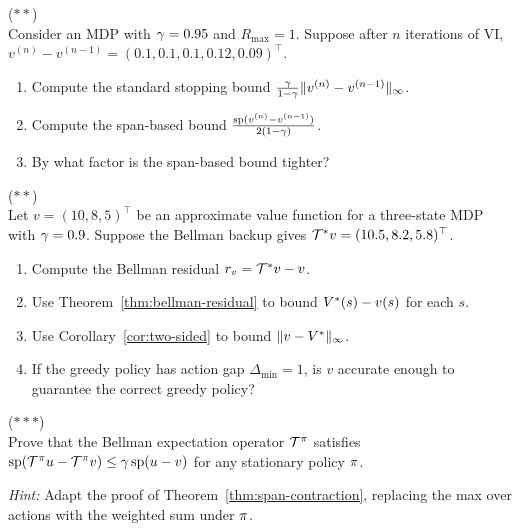 \documentclass[11pt,a4paper]{article}
\begin{document}
\begin{exercise}
\textnormal{(\(**\))} \\
Consider an MDP with $\gamma = 0.95$ and $R_{\max} = 1$. Suppose
after $n$ iterations of VI, $v^{(n)} - v^{(n-1)} = (0.1, 0.1, 0.1,
0.12, 0.09)^\top$.
\begin{enumerate}[label=(\alph*)]
    \item Compute the standard stopping bound
    $\frac{\gamma}{1-\gamma}\|v^{(n)} -
    v^{(n-1)}\|_\infty$.
    \item Compute the span-based bound
    $\frac{\mathrm{sp}(v^{(n)} - v^{(n-1)})}{2(1-\gamma)}$.
    \item By what factor is the span-based bound tighter?
\end{enumerate}
\end{exercise}

\begin{exercise} \textnormal{(\(**\))} \\
Let $v = (10, 8, 5)^\top$ be an approximate value function for a
three-state MDP with $\gamma = 0.9$. Suppose the Bellman backup
gives $\mathcal{T}^* v = (10.5, 8.2, 5.8)^\top$.
\begin{enumerate}[label=(\alph*)]
    \item Compute the Bellman residual $r_v = \mathcal{T}^* v - v$.
    \item Use Theorem~\ref{thm:bellman-residual} to bound
    $V^*(s) - v(s)$ for each $s$.
    \item Use Corollary~\ref{cor:two-sided} to bound
    $\|v - V^*\|_\infty$.
    \item If the greedy policy has action gap $\Delta_{\min} = 1$,
    is $v$ accurate enough to guarantee the correct greedy policy?
\end{enumerate}
\end{exercise}

\begin{exercise}
\textnormal{(\(***\))} \\
Prove that the Bellman expectation operator $\mathcal{T}^\pi$
satisfies $\mathrm{sp}(\mathcal{T}^\pi u - \mathcal{T}^\pi v)
\leq \gamma\, \mathrm{sp}(u - v)$ for any stationary policy
$\pi$.

\textit{Hint:} Adapt the proof of Theorem~\ref{thm:span-contraction},
replacing the max over actions with the weighted sum under $\pi$.
\end{exercise}
\end{document}
